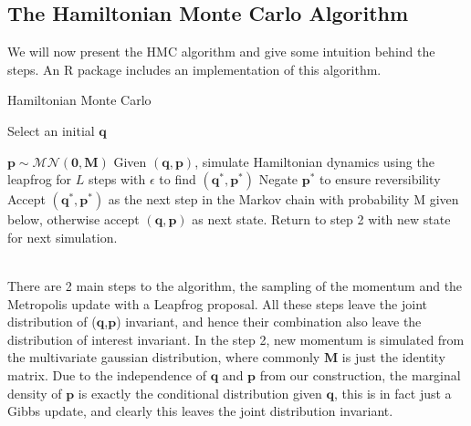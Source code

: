\documentclass[11pt]{article}
\begin{document}


\pagebreak
\subsection{The Hamiltonian Monte Carlo Algorithm}
We will now present the HMC algorithm and give some intuition behind the steps. An R package includes an implementation of this algorithm. 
\begin{algorithm}
\caption{Hamiltonian Monte Carlo}\label{euclid}
\begin{algorithmic}[1] 
\State Select an initial $\mathbf{q}$ 

\State $\mathbf{p}\sim \mathcal{MN}(\mathbf{0},\mathbf{M})$
\State Given $(\mathbf{q},\mathbf{p})$, simulate Hamiltonian dynamics using the leapfrog for $L$ steps with $\epsilon$ to find $(\mathbf{q^{*}},\mathbf{p^{*}})$ 
\State Negate $\mathbf{p^{*}}$ to ensure reversibility 
\State Accept $(\mathbf{q^{*}}, \mathbf{p^{*}})$ as the next step in the Markov chain with probability M given below, otherwise accept $(\mathbf{q},\mathbf{p})$ as next state.
\State Return to step 2 with new state for next simulation.
\end{algorithmic}
\end{algorithm}\\
\noindent There are 2 main steps to the algorithm, the sampling of the momentum and the Metropolis update with a Leapfrog proposal. All these steps leave the joint distribution of ($\mathbf{q}$,$\mathbf{p}$) invariant, and hence their combination also leave the distribution of interest invariant. In the step 2, new momentum is simulated from the multivariate gaussian distribution, where commonly $\mathbf{M}$ is just the identity matrix. Due to the independence of $\mathbf{q}$ and $\mathbf{p}$ from our construction, the marginal density of $\mathbf{p}$ is exactly the conditional distribution given $\mathbf{q}$, this is in fact just a Gibbs update, and clearly this leaves the joint distribution invariant. 
\\
\end{document}
